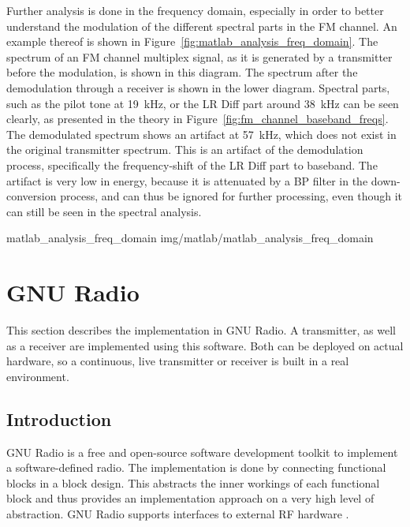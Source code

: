 Further analysis is done in the frequency domain, especially in order to better understand the modulation of the different spectral parts in the FM channel.
An example thereof is shown in Figure~\ref{fig:matlab_analysis_freq_domain}.
The spectrum of an FM channel multiplex signal, as it is generated by a transmitter before the modulation, is shown in this diagram.
The spectrum after the demodulation through a receiver is shown in the lower diagram.
Spectral parts, such as the pilot tone at 19~kHz, or the LR Diff part around 38~kHz can be seen clearly, as presented in the theory in Figure~\ref{fig:fm_channel_baseband_freqs}.
The demodulated spectrum shows an artifact at 57~kHz, which does not exist in the original transmitter spectrum.
This is an artifact of the demodulation process, specifically the frequency-shift of the LR Diff part to baseband.
The artifact is very low in energy, because it is attenuated by a BP filter in the down-conversion process, and can thus be ignored for further processing, even though it can still be seen in the spectral analysis.

 {matlab_analysis_freq_domain} {img/matlab/matlab_analysis_freq_domain}

\section{GNU Radio}

This section describes the implementation in GNU Radio.
A transmitter, as well as a receiver are implemented using this software.
Both can be deployed on actual hardware, so a continuous, live transmitter or receiver is built in a real environment.

\subsection{Introduction}

GNU Radio is a free and open-source software development toolkit to implement a software-defined radio.
The implementation is done by connecting functional blocks in a block design.
This abstracts the inner workings of each functional block and thus provides an implementation approach on a very high level of abstraction.
GNU Radio supports interfaces to external RF hardware \cite{SoftwareGnuRadio}.

